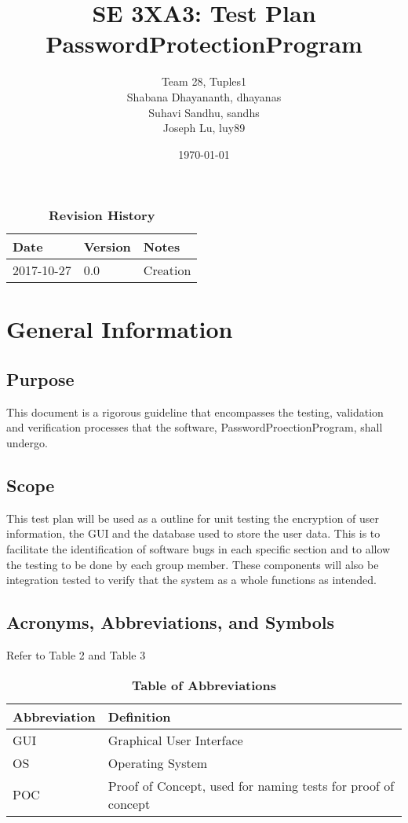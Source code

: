 \documentclass[12pt, titlepage]{article}
\title{SE 3XA3: Test Plan\\PasswordProtectionProgram}
\author{Team 28, Tuples1
		\\ Shabana Dhayananth, dhayanas
		\\ Suhavi Sandhu, sandhs
		\\ Joseph Lu, luy89
}
\date{\today}
\begin{document}
\maketitle

\tableofcontents
\listoftables
\listoffigures

\begin{table}[bp]
\caption{\bf Revision History}
\begin{tabularx}{\textwidth}{p{3cm}p{2cm}X}
\toprule {\bf Date} & {\bf Version} & {\bf Notes}\\
\midrule
2017-10-27 & 0.0 & Creation\\
\bottomrule
\end{tabularx}
\end{table}

\newpage


\section{General Information}

\subsection{Purpose}
This document is a rigorous guideline that encompasses the testing, validation and verification processes that the software, PasswordProectionProgram, shall undergo.

\subsection{Scope}
This test plan will be used as a outline for unit testing the encryption of user information, the GUI and the database used to store the user data. This is to facilitate the identification of software bugs in each specific section and to allow the testing to be done by each group member. These components will also be integration tested to verify that the system as a whole functions as intended.


\subsection{Acronyms, Abbreviations, and Symbols}
Refer to Table 2 and Table 3
	
\begin{table}[hbp]
\caption{\textbf{Table of Abbreviations}} \label{Table}

    \begin{tabularx}{\textwidth}{p{3cm}X}
        \toprule
        \textbf{Abbreviation} & \textbf{Definition} \\
        \midrule
        GUI & Graphical User Interface\\\hline
        OS & Operating System\\\hline
        POC & Proof of Concept, used for naming tests for proof of concept\\
        \bottomrule
    \end{tabularx}

\end{table}
\end{document}
